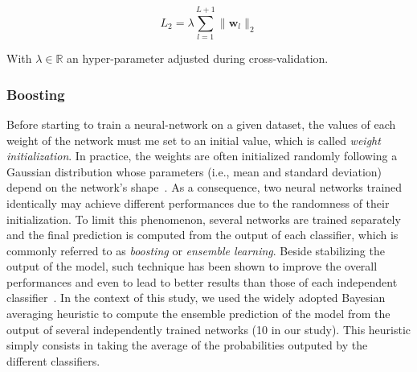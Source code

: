 \begin{equation}
L_{2} = \lambda \sum_{l=1}^{L+1} \|\textbf{w}_{l}\|_{2}
\end{equation}

With $\lambda \in \mathbb{R}$ an hyper-parameter adjusted during cross-validation.

\subsubsection{Boosting}
\label{boosting}
Before starting to train a neural-network on a given dataset, the values of each weight of the network must me set to an initial value, which is called \textit{weight initialization}. In practice, the weights are often initialized randomly following a Gaussian distribution whose parameters (i.e., mean and standard deviation) depend on the network's shape~\cite{glorot2010understanding}. As a consequence, two neural networks trained identically may achieve different performances due to the randomness of their initialization. To limit this phenomenon, several networks are trained separately and the final prediction is computed from the output of each classifier, which is commonly referred to as \textit{boosting} or \textit{ensemble learning}. Beside stabilizing the output of the model, such technique has been shown to improve the overall performances and even to lead to better results than those of each independent classifier~\cite{dietterich2000ensemble}. In the context of this study, we used the widely adopted Bayesian averaging heuristic to compute the ensemble prediction of the model from the output of several independently trained networks (10 in our study). This heuristic simply consists in taking the average of the probabilities outputed by the different classifiers. 

